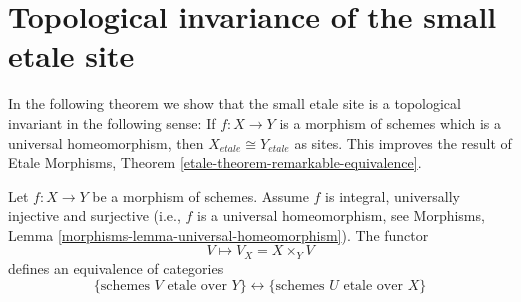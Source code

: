 \section{Topological invariance of the small etale site}
\label{section-topological-invariance}

\noindent
In the following theorem we show that the small etale site is a topological
invariant in the following sense: If $f : X \to Y$ is a morphism of schemes
which is a universal homeomorphism, then $X_{etale} \cong Y_{etale}$
as sites. This improves the result of
Etale Morphisms, Theorem \ref{etale-theorem-remarkable-equivalence}.

\begin{theorem}
\label{theorem-topological-invariance}
Let $f : X \to Y$ be a morphism of schemes.
Assume $f$ is integral, universally injective and surjective
(i.e., $f$ is a universal homeomorphism, see
Morphisms, Lemma \ref{morphisms-lemma-universal-homeomorphism}).
The functor
$$
V \longmapsto V_X = X \times_Y V
$$
defines an equivalence of categories
$$
\{
\text{schemes }V\text{ etale over }Y
\}
\leftrightarrow
\{
\text{schemes }U\text{ etale over }X
\}
$$
\end{theorem}

